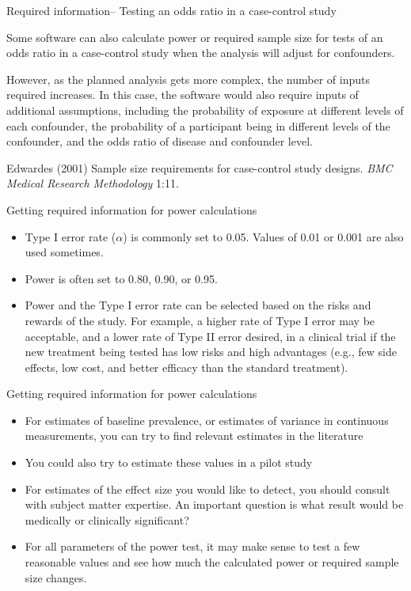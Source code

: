 \documentclass[ignorenonframetext,]{beamer}
\providecommand{\tightlist}{%
  \setlength{\itemsep}{0pt}\setlength{\parskip}{0pt}}
\begin{document}
\begin{frame}{Required information-- Testing an odds ratio in a
case-control study}

Some software can also calculate power or required sample size for tests
of an odds ratio in a case-control study when the analysis will adjust
for confounders.

However, as the planned analysis gets more complex, the number of inputs
required increases. In this case, the software would also require inputs
of additional assumptions, including the probability of exposure at
different levels of each confounder, the probability of a participant
being in different levels of the confounder, and the odds ratio of
disease and confounder level.

\footnotesize{Edwardes (2001) Sample size requirements for case-control study designs. \textit{BMC Medical Research Methodology} 1:11.}

\end{frame}

\begin{frame}{Getting required information for power calculations}

\begin{itemize}
\tightlist
\item
  Type I error rate (\(\alpha\)) is commonly set to 0.05. Values of 0.01
  or 0.001 are also used sometimes.
\item
  Power is often set to 0.80, 0.90, or 0.95.
\item
  Power and the Type I error rate can be selected based on the risks and
  rewards of the study. For example, a higher rate of Type I error may
  be acceptable, and a lower rate of Type II error desired, in a
  clinical trial if the new treatment being tested has low risks and
  high advantages (e.g., few side effects, low cost, and better efficacy
  than the standard treatment).
\end{itemize}

\end{frame}

\begin{frame}{Getting required information for power calculations}

\begin{itemize}
\tightlist
\item
  For estimates of baseline prevalence, or estimates of variance in
  continuous measurements, you can try to find relevant estimates in the
  literature
\item
  You could also try to estimate these values in a pilot study
\item
  For estimates of the effect size you would like to detect, you should
  consult with subject matter expertise. An important question is what
  result would be medically or clinically significant?
\item
  For all parameters of the power test, it may make sense to test a few
  reasonable values and see how much the calculated power or required
  sample size changes.
\end{itemize}

\end{frame}
\end{document}
